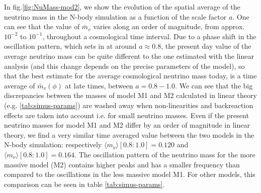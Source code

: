 In fig.\ref{fig:NuMass-mod2}, we show the evolution of the spatial
average of the neutrino mass in the N-body simulation as a function
of the scale factor $a$. One can see that the value of $\bar{m}_{v}$
varies along an order of magnitude, from approx.$10^{-2}$ to $10^{-1}$,
throughout a cosmological time interval. Due to a phase shift in the
oscillation pattern, which sets in at around $a\approx0.8$, the present
day value of the average neutrino mass can be quite different to the
one estimated with the linear analysis (and this change depends on
the precise parameters of the model), so that the best estimate for
the average cosmological neutrino mass today, is a time average of
$\bar{m}_{v}(\phi)$ at late times, between $a=0.8-1.0$. We can see
that the big discrepancies between the masses of model M1 and M2 calculated
in linear theory (e.g. \ref{tab:simus-params}) are washed away
when non-linearities and backreaction effects are taken into account
i.e. for small neutrino masses. Even if the present neutrino masses
for model M1 and M2 differ by an order of magnitude in linear theory,
we find a very similar time averaged value between the two models
in the N-body simulation: respectively $\langle m_{\nu}\rangle[0.8:1.0]=0.120$
and $\langle m_{\nu}\rangle[0.8:1.0]=0.164$. The oscillation pattern
of the neutrino mass for the more massive model (M2) contains higher
peaks and has a smaller frequency than compared to the oscillations
in the less massive model M1. For other models, this comparison can
be seen in table \ref{tab:simus-params}.

